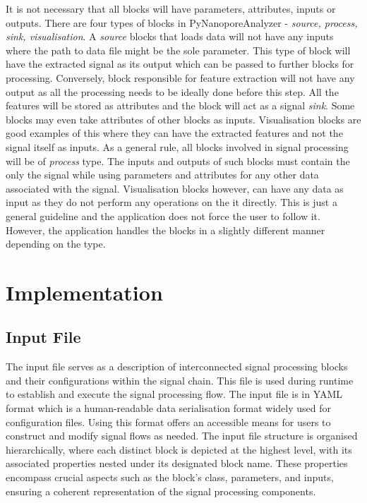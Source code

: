 \documentclass[journal]{IEEEtran}
\begin{document}
It is not necessary that all blocks will have parameters, attributes, inputs or outputs. There are four types of blocks in PyNanoporeAnalyzer - \textit{source, process, sink, visualisation}. A \textit{source} blocks that loads data will not have any inputs where the path to data file might be the sole parameter. This type of block will have the extracted signal as its output which can be passed to further blocks for processing. Conversely, block responsible for feature extraction will not have any output as all the processing needs to be ideally done before this step. All the features will be stored as attributes and the block will act as a signal \textit{sink}. Some blocks may even take attributes of other blocks as inputs. Visualisation blocks are good examples of this where they can have the extracted features and not the signal itself as inputs. As a general rule, all blocks involved in signal processing will be of \textit{process} type. The inputs and outputs of such blocks must contain the only the signal while using parameters and attributes for any other data associated with the signal. Visualisation blocks however, can have any data as input as they do not perform any operations on the it directly. This is just a general guideline and the application does not force the user to follow it. However, the application handles the blocks in a slightly different manner depending on the type.

\section{Implementation}
\subsection{Input File}
The input file serves as a description of interconnected signal processing blocks and their configurations within the signal chain. This file is used during runtime to establish and execute the signal processing flow. The input file is in YAML format which is a human-readable data serialisation format \cite{OfficialYAMLWeb} widely used for configuration files. Using this format offers an accessible means for users to construct and modify signal flows as needed. The input file structure is organised hierarchically, where each distinct block is depicted at the highest level, with its associated properties nested under its designated block name. These properties encompass crucial aspects such as the block's class, parameters, and inputs, ensuring a coherent representation of the signal processing components. 
\end{document}
